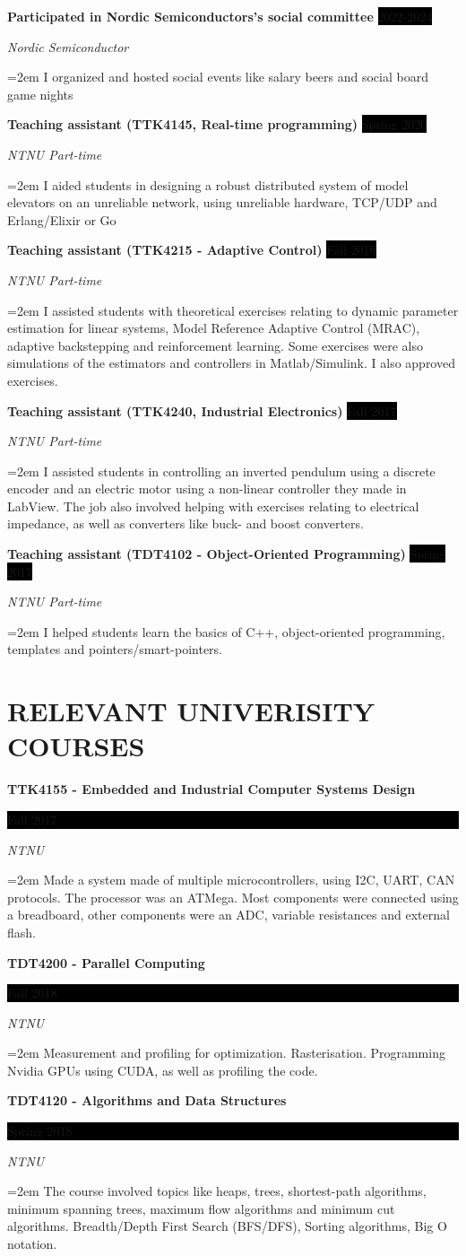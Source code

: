 \documentclass[paper=a4,fontsize=11pt,norsk]{scrartcl} %
\newcommand{\NewPart}[1]{\section*{\uppercase{#1}}}
\newcommand{\EducationEntry}[4]{
		\noindent \textbf{#1} \hfill      %
		\colorbox{Black}{%
			\parbox{6em}{%
			\hfill\color{White}#2}} \par  %
		\noindent \textit{#3} \par        %
		\noindent\hangindent=2em\hangafter=0 \small #4 %
		\normalsize \par}
\newcommand{\WorkEntry}[4]{				  %
		\noindent \textbf{#1} \hfill      %
		\colorbox{Black}{\color{White}#2} \par  %
		\noindent \textit{#3} \par              %
		\noindent\hangindent=2em\hangafter=0 \small #4 %
		\normalsize \par}
\begin{document}
\WorkEntry{Participated in Nordic Semiconductors's social committee}{2022-2024}{Nordic Semiconductor}
{I organized and hosted social events like salary beers and social board game nights}

\WorkEntry{Teaching assistant (TTK4145, Real-time programming)}{Spring 2020}{NTNU Part-time}
{I aided students in designing a robust distributed system of model elevators on an unreliable network, using unreliable hardware, TCP/UDP and Erlang/Elixir or Go}

\WorkEntry{Teaching assistant (TTK4215 - Adaptive Control)}{Fall 2019}{NTNU Part-time}
{I assisted students with theoretical exercises relating to dynamic parameter estimation for linear systems, Model Reference Adaptive Control (MRAC), adaptive backstepping and reinforcement learning. Some exercises were also simulations of the estimators and controllers in Matlab/Simulink. I also approved exercises.
}


\WorkEntry{Teaching assistant (TTK4240, Industrial Electronics)}{Fall 2017}{NTNU Part-time}
{I assisted students in controlling an inverted pendulum using a discrete encoder and an electric motor using a non-linear controller they made in LabView. The job also involved helping with exercises relating to electrical impedance, as well as converters like buck- and boost converters.
}

\WorkEntry{Teaching assistant (TDT4102 - Object-Oriented Programming)}{Spring 2017}{NTNU Part-time}
{I helped students learn the basics of C++, object-oriented programming, templates and pointers/smart-pointers.
}


\NewPart{Relevant univerisity Courses}{}


\EducationEntry{TTK4155 - Embedded and Industrial Computer Systems Design}{Fall 2017}{NTNU}
{Made a system made of multiple microcontrollers, using I2C, UART, CAN protocols. The processor was an ATMega. Most components were connected using a breadboard, other components were an ADC, variable resistances and external flash.
}


\EducationEntry{TDT4200 - Parallel Computing}{Fall 2018}{NTNU}
{
Measurement and profiling for optimization. Rasterisation. Programming Nvidia GPUs using CUDA, as well as profiling the code.
}

\EducationEntry{TDT4120 - Algorithms and Data Structures}{Spring 2018}{NTNU}
{The course involved topics like heaps, trees, shortest-path algorithms, minimum spanning trees, maximum flow algorithms and minimum cut algorithms. Breadth/Depth First Search (BFS/DFS), Sorting algorithms, Big O notation.
}
\end{document}
